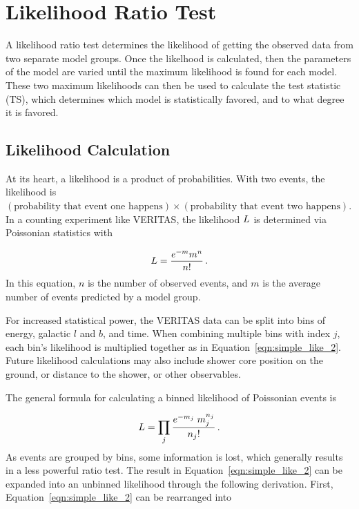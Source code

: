 \section{Likelihood Ratio Test}\label{sec:likeratio}
A likelihood ratio test determines the likelihood of getting the observed data from two separate model groups.
Once the likelhood is calculated, then the parameters of the model are varied until the maximum likelihood is found for each model.
These two maximum likelihoods can then be used to calculate the test statistic (TS), which determines which model is statistically favored, and to what degree it is favored.

\subsection{Likelihood Calculation}
At its heart, a likelihood is a product of probabilities.
With two events, the likelihood is $(\textrm{probability that event one happens})\times(\textrm{probability that event two happens})$.
In a counting experiment like VERITAS, the likelihood $L$ is determined via Poissonian statistics with

\begin{equation}\label{eqn:simple_like}
  L = \frac{e^{-m} m^n}{n!} \,.
\end{equation}
In this equation, $n$ is the number of observed events, and $m$ is the average number of events predicted by a model group.

For increased statistical power, the VERITAS data can be split into bins of energy, galactic $l$ and $b$, and time.
When combining multiple bins with index $j$, each bin's likelihood is multiplied together as in Equation~\ref{eqn:simple_like_2}.
Future likelihood calculations may also include shower core position on the ground, or distance to the shower, or other observables.

The general formula for calculating a binned likelihood of Poissonian events is

\begin{equation}\label{eqn:simple_like_2}
  L = \prod_j \frac{ e^{-m_j} \; m_{j}^{n_j}}{n_{j}!} \,.
\end{equation}
As events are grouped by bins, some information is lost, which generally results in a less powerful ratio test.
The result in Equation~\ref{eqn:simple_like_2} can be expanded into an unbinned likelihood through the following derivation.
First, Equation~\ref{eqn:simple_like_2} can be rearranged into

